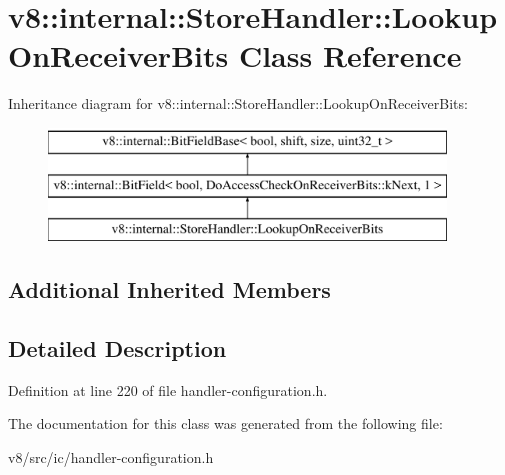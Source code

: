 \hypertarget{classv8_1_1internal_1_1StoreHandler_1_1LookupOnReceiverBits}{}\section{v8\+:\+:internal\+:\+:Store\+Handler\+:\+:Lookup\+On\+Receiver\+Bits Class Reference}
\label{classv8_1_1internal_1_1StoreHandler_1_1LookupOnReceiverBits}
Inheritance diagram for v8\+:\+:internal\+:\+:Store\+Handler\+:\+:Lookup\+On\+Receiver\+Bits\+:\begin{figure}[H]
\begin{center}
\leavevmode
\includegraphics[height=3.000000cm]{classv8_1_1internal_1_1StoreHandler_1_1LookupOnReceiverBits}
\end{center}
\end{figure}
\subsection*{Additional Inherited Members}


\subsection{Detailed Description}


Definition at line 220 of file handler-\/configuration.\+h.



The documentation for this class was generated from the following file\+:\begin{DoxyCompactItemize}
\item 
v8/src/ic/handler-\/configuration.\+h\end{DoxyCompactItemize}

